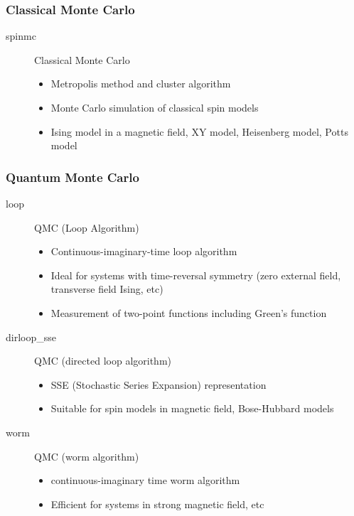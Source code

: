 \begin{frame}[t,fragile]
  \frametitle{Classical Monte Carlo}
  \begin{description}
  \item[spinmc] Classical Monte Carlo
    \begin{itemize}
      \item Metropolis method and cluster algorithm
      \item Monte Carlo simulation of classical spin models
      \item Ising model in a magnetic field, XY model, Heisenberg model, Potts model
    \end{itemize}
  \end{description}
\end{frame}

\begin{frame}[t,fragile]
  \frametitle{Quantum Monte Carlo}
  \begin{description}
  \item[loop] QMC (Loop Algorithm)
    \begin{itemize}
      \item Continuous-imaginary-time loop algorithm
      \item Ideal for systems with time-reversal symmetry (zero external field, transverse field Ising, etc)
      \item Measurement of two-point functions including Green's function
    \end{itemize}
  \item[dirloop\_sse] QMC (directed loop algorithm)
    \begin{itemize}
      \item SSE (Stochastic Series Expansion) representation
      \item Suitable for spin models in magnetic field, Bose-Hubbard models
    \end{itemize}
  \item[worm] QMC (worm algorithm)
    \begin{itemize}
      \item continuous-imaginary time worm algorithm
      \item Efficient for systems in strong magnetic field, etc
    \end{itemize}
  \end{description}
\end{frame}


